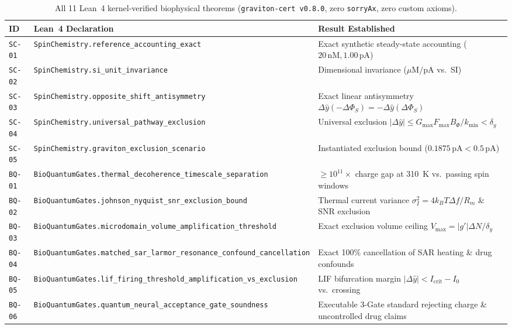 \documentclass[11pt,a4paper]{article}
\theoremstyle{plain}
\theoremstyle{remark}
\newcommand{\code}[1]{\texttt{\small #1}}
\begin{document}
\begin{table}[t]
\centering
\scriptsize
\renewcommand{\code}[1]{\texttt{#1}}
\setlength{\tabcolsep}{4pt}
\renewcommand{\arraystretch}{1.15}
\begin{tabular}{@{}l >{\tiny}l >{\raggedright\arraybackslash}p{6.5cm}@{}}
\toprule
\textbf{ID} & {\scriptsize\textbf{Lean~4 Declaration}} & \textbf{Result Established} \\
\midrule
\code{SC-01} & \code{SpinChemistry.reference\_accounting\_exact} & Exact synthetic steady-state accounting ($20\,\mathrm{nM}, 1.00\,\mathrm{pA}$) \\
\code{SC-02} & \code{SpinChemistry.si\_unit\_invariance} & Dimensional invariance ($\mu\mathrm{M}/\mathrm{pA}$ vs.\ SI) \\
\code{SC-03} & \code{SpinChemistry.opposite\_shift\_antisymmetry} & Exact linear antisymmetry $\Delta\hat{y}(-\Delta\Phi_S)=-\Delta\hat{y}(\Delta\Phi_S)$ \\
\code{SC-04} & \code{SpinChemistry.universal\_pathway\_exclusion} & Universal exclusion $|\Delta\hat{y}|\le G_{\max}F_{\max}B_\Phi/k_{\min}<\delta_y$ \\
\code{SC-05} & \code{SpinChemistry.graviton\_exclusion\_scenario} & Instantiated exclusion bound ($0.1875\,\mathrm{pA} < 0.5\,\mathrm{pA}$) \\
\midrule
\code{BQ-01} & \code{BioQuantumGates.thermal\_decoherence\_timescale\_separation} & $\ge 10^{11}\times$ charge gap at 310~K vs.\ passing spin windows \\
\code{BQ-02} & \code{BioQuantumGates.johnson\_nyquist\_snr\_exclusion\_bound} & Thermal current variance $\sigma_I^2=4k_BT\Delta f/R_m$ \& SNR exclusion \\
\code{BQ-03} & \code{BioQuantumGates.microdomain\_volume\_amplification\_threshold} & Exact exclusion volume ceiling $V_{\max}=|g'|\Delta N/\delta_y$ \\
\code{BQ-04} & \code{BioQuantumGates.matched\_sar\_larmor\_resonance\_confound\_cancellation} & Exact 100\% cancellation of SAR heating \& drug confounds \\
\code{BQ-05} & \code{BioQuantumGates.lif\_firing\_threshold\_amplification\_vs\_exclusion} & LIF bifurcation margin $|\Delta\hat{y}|<I_{\mathrm{crit}}-I_0$ vs.\ crossing \\
\code{BQ-06} & \code{BioQuantumGates.quantum\_neural\_acceptance\_gate\_soundness} & Executable 3-Gate standard rejecting charge \& uncontrolled drug claims \\
\bottomrule
\end{tabular}
\caption{All 11 Lean~4 kernel-verified biophysical theorems (\code{graviton-cert v0.8.0}, zero \code{sorryAx}, zero custom axioms).}
\label{tab:bq}
\end{table}
\end{document}
